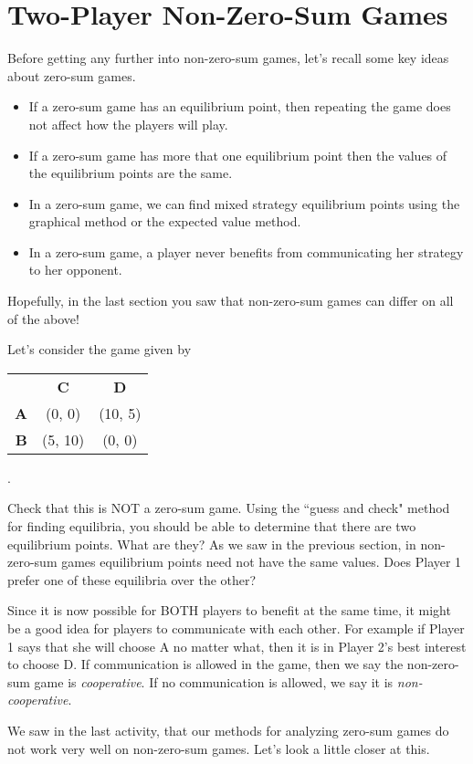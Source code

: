 
\section{Two-Player Non-Zero-Sum Games}

Before getting any further into non-zero-sum games, let's recall some key ideas about zero-sum games. 
\begin{itemize}
\item If a zero-sum game has an equilibrium point, then repeating the game does not affect how the players will play. 
\item If a zero-sum game has more that one equilibrium point then the values of the equilibrium points are the same.
\item In a zero-sum game, we can find mixed strategy equilibrium points using the graphical method or the expected value method.
\item In a zero-sum game, a player never benefits from communicating her strategy to her opponent.
\end{itemize}

Hopefully, in the last section you saw that non-zero-sum games can differ on all of the above!

Let's  consider the game given by 

\begin{tabular}{rcc}
&\textbf{C}&\textbf{D}\\ 
\textbf{A} &(0, 0)&(10, 5) \\ 
\textbf{B}&(5, 10)&(0, 0) \\ 
\end{tabular}.

Check that this is NOT a zero-sum game. Using the ``guess and check" method for finding equilibria, you should be able to determine that there are two equilibrium points. What are they? As we saw in the previous section, in non-zero-sum games equilibrium points need not have the same values. Does Player 1 prefer one of these equilibria over the other?

Since it is now possible for BOTH players to benefit at the same time, it might be a good idea for players to communicate with each other. For example if Player 1 says that she will choose A no matter what, then it is in Player 2's best interest to choose D. If communication is allowed in the game, then we say the non-zero-sum game is {\it cooperative}. If no communication is allowed, we say it is {\it non-cooperative}. 

We saw in the last activity, that our methods for analyzing zero-sum games do not work very well on non-zero-sum games. Let's look a little closer at this. 

